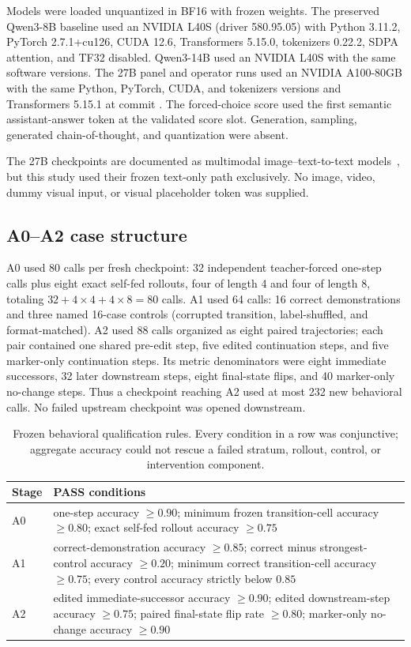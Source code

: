 \documentclass[10pt,a4paper]{article}
\newcommand{\hash}[1]{\texttt{\seqsplit{#1}}}
\begin{document}
Models were loaded unquantized in BF16 with frozen weights. The preserved Qwen3-8B baseline used an NVIDIA L40S (driver 580.95.05) with Python 3.11.2, PyTorch 2.7.1+cu126, CUDA 12.6, Transformers 5.15.0, tokenizers 0.22.2, SDPA attention, and TF32 disabled. Qwen3-14B used an NVIDIA L40S with the same software versions. The 27B panel and operator runs used an NVIDIA A100-80GB with the same Python, PyTorch, CUDA, and tokenizers versions and Transformers 5.15.1 at commit \hash{550d7b3834670483a4df436541272c055dc364bf}. The forced-choice score used the first semantic assistant-answer token at the validated score slot. Generation, sampling, generated chain-of-thought, and quantization were absent.

The 27B checkpoints are documented as multimodal image--text-to-text models~\cite{qwen35card,qwen36card,qwen38card}, but this study used their frozen text-only path exclusively. No image, video, dummy visual input, or visual placeholder token was supplied.

\subsection{A0--A2 case structure}

A0 used 80 calls per fresh checkpoint: 32 independent teacher-forced one-step calls plus eight exact self-fed rollouts, four of length 4 and four of length 8, totaling $32+4\times4+4\times8=80$ calls. A1 used 64 calls: 16 correct demonstrations and three named 16-case controls (corrupted transition, label-shuffled, and format-matched). A2 used 88 calls organized as eight paired trajectories; each pair contained one shared pre-edit step, five edited continuation steps, and five marker-only continuation steps. Its metric denominators were eight immediate successors, 32 later downstream steps, eight final-state flips, and 40 marker-only no-change steps. Thus a checkpoint reaching A2 used at most 232 new behavioral calls. No failed upstream checkpoint was opened downstream.

\begin{table}[H]
\centering
\scriptsize
\caption{Frozen behavioral qualification rules. Every condition in a row was conjunctive; aggregate accuracy could not rescue a failed stratum, rollout, control, or intervention component.}
\label{tab:behavioral-thresholds}
\begin{tabularx}{\textwidth}{@{}lY@{}}
\toprule
Stage & PASS conditions \\
\midrule
A0 & one-step accuracy $\geq0.90$; minimum frozen transition-cell accuracy $\geq0.80$; exact self-fed rollout accuracy $\geq0.75$ \\
A1 & correct-demonstration accuracy $\geq0.85$; correct minus strongest-control accuracy $\geq0.20$; minimum correct transition-cell accuracy $\geq0.75$; every control accuracy strictly below $0.85$ \\
A2 & edited immediate-successor accuracy $\geq0.90$; edited downstream-step accuracy $\geq0.75$; paired final-state flip rate $\geq0.80$; marker-only no-change accuracy $\geq0.90$ \\
\bottomrule
\end{tabularx}
\end{table}
\end{document}

